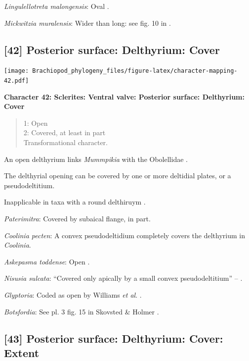 \documentclass[]{book}
\theoremstyle{definition}
\theoremstyle{definition}
\theoremstyle{definition}
\theoremstyle{remark}
\begin{document}
\emph{Lingulellotreta malongensis}: Oval
\citep{Williams2000BrachiopodaLinguliformea}.

\emph{Mickwitzia muralensis}: Wider than long: see fig. 10 in
\citet{Balthasar2004Shellstructure}.

\hypertarget{posterior-surface-delthyrium-cover}{%
\subsection*{{[}42{]} Posterior surface: Delthyrium:
Cover}\label{posterior-surface-delthyrium-cover}}

\texttt{[image: Brachiopod\_phylogeny\_files/figure-latex/character-mapping-42.pdf]}

\textbf{Character 42: Sclerites: Ventral valve: Posterior surface:
Delthyrium: Cover}

\begin{quote}
1: Open\\
2: Covered, at least in part\\
Transformational character.
\end{quote}

An open delthyrium links \emph{Mummpikia} with the Obolellidae
\citep{Balthasar2008iMummpikia}.

The delthyrial opening can be covered by one or more deltidial plates,
or a pseudodeltitium.

Inapplicable in taxa with a round delthiruym \citep[generated by
overgrowth of the delthyrial opening by posterolateral parts of the
shell, per][]{Popov1992TheCambrian}.

\emph{Paterimitra}: Covered by subaical flange, in part.

\emph{Coolinia pecten}: A convex pseudodeltidium completely covers the
delthyrium in \emph{Coolinia}.

\emph{Askepasma toddense}: Open \citep{Topper2013Theoldest}.

\emph{Nisusia sulcata}: ``Covered only apically by a small convex
pseudodeltitium'' -- \citet{Holmer2018Evolutionarysignificance}.

\emph{Glyptoria}: Coded as open by Williams \emph{et al}.
\citeyearpar{Williams1998Thediversity}.

\emph{Botsfordia}: See pl. 3 fig. 15 in Skovsted \& Holmer
\citeyearpar{Skovsted2005EarlyCambrian}.

\hypertarget{posterior-surface-delthyrium-cover-extent}{%
\subsection*{{[}43{]} Posterior surface: Delthyrium: Cover:
Extent}\label{posterior-surface-delthyrium-cover-extent}}
\end{document}
